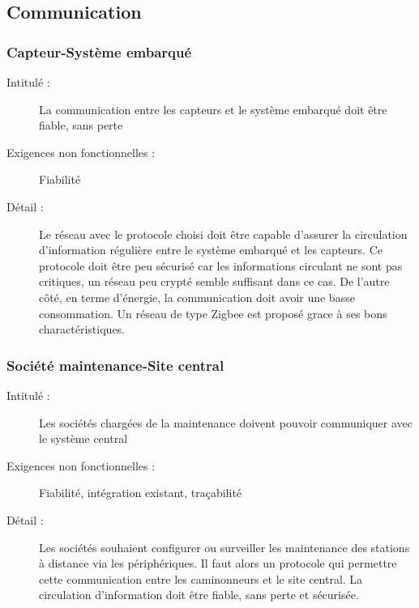 \documentclass[11pt]{article}
\begin{document}
\subsection {Communication}

\subsubsection {Capteur-Système embarqué}
\begin{description}
           \item[Intitulé :] La communication entre les capteurs et le système embarqué doit être fiable, sans perte 
           \item[Exigences non fonctionnelles :] Fiabilité
           \item[Détail :] Le réseau avec le protocole choisi doit être capable d’assurer la circulation d’information régulière entre le système embarqué et les capteurs. Ce protocole doit être peu sécurisé car les informations circulant ne sont pas critiques, un réseau peu crypté semble suffisant dans ce cas. De l'autre côté, en terme d'énergie, la communication doit avoir une basse consommation.
Un réseau de type Zigbee est proposé grace à ses bons charactéristiques.
\end{description} 

\subsubsection {Société maintenance-Site central}
\begin{description}
           \item[Intitulé :] Les sociétés chargées de la maintenance doivent pouvoir communiquer avec le système central 
           \item[Exigences non fonctionnelles :] Fiabilité, intégration existant, traçabilité
           \item[Détail :] Les sociétés souhaient configurer ou surveiller les maintenance des stations à distance via les périphériques. Il faut alors un protocole qui permettre cette communication entre les caminonneurs et le site central. La circulation d'information
doit être fiable, sans perte et sécurisée. 
\end{description}
\end{document}

